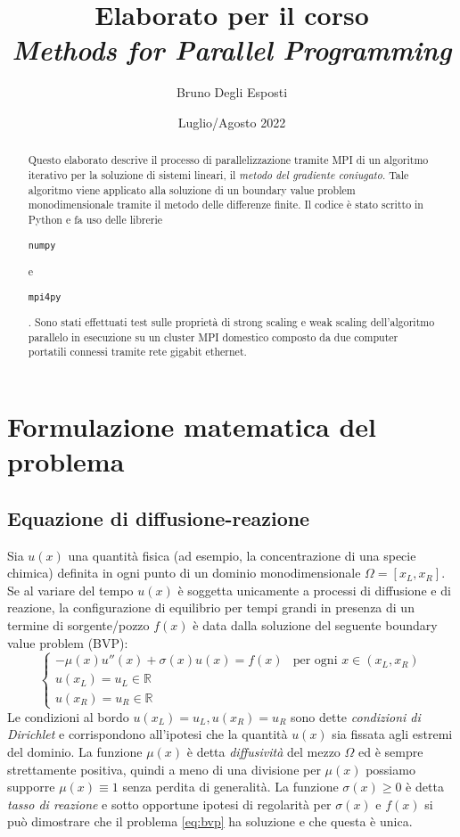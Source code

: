 \documentclass[a4paper,11pt]{article}
\title{\Huge{\bf{
	Elaborato per il corso \\
	\emph{Methods for Parallel Programming}
}}}
\author{\huge{Bruno Degli Esposti}}
\date{\Large{Luglio/Agosto 2022}}
\newcommand{\R}{\mathbb{R}}
\newcommand{\code}[1]{\begin{small}\texttt{#1}\end{small}}
\begin{document}
\maketitle

\begin{abstract}
Questo elaborato descrive il processo di parallelizzazione
tramite MPI di un algoritmo iterativo per la soluzione di
sistemi lineari, il \emph{metodo del gradiente coniugato}.
Tale algoritmo viene applicato alla soluzione di un
boundary value problem monodimensionale tramite il metodo
delle differenze finite. Il codice è stato scritto in Python
e fa uso delle librerie \code{numpy} e \code{mpi4py}.
Sono stati effettuati test sulle proprietà di strong scaling
e weak scaling dell'algoritmo parallelo in esecuzione su
un cluster MPI domestico composto da due computer portatili
connessi tramite rete gigabit ethernet.
\end{abstract}

\section{Formulazione matematica del problema}
\subsection{Equazione di diffusione-reazione}
Sia $u(x)$ una quantità fisica (ad esempio, la concentrazione
di una specie chimica) definita in ogni punto di un dominio
monodimensionale $\Omega = [x_L,x_R]$. Se al variare del tempo
$u(x)$ è soggetta unicamente a processi di diffusione e di
reazione, la configurazione di equilibrio per tempi grandi
in presenza di un termine di sorgente/pozzo $f(x)$ è data
dalla soluzione del seguente boundary value problem (BVP):
\begin{equation} \label{eq:bvp}
\begin{cases}
-\mu(x) u''(x) + \sigma(x) u(x) = f(x)
& \text{per ogni $x \in (x_L,x_R)$} \\
u(x_L) = u_L \in \R \\
u(x_R) = u_R \in \R
\end{cases}
\end{equation}
Le condizioni al bordo $u(x_L) = u_L, u(x_R) = u_R$ sono dette
\emph{condizioni di Dirichlet} e corrispondono all'ipotesi che
la quantità $u(x)$ sia fissata agli estremi del dominio.
La funzione $\mu(x)$ è detta \emph{diffusività} del mezzo $\Omega$
ed è sempre strettamente positiva, quindi a meno di una divisione
per $\mu(x)$ possiamo supporre $\mu(x) \equiv 1$ senza perdita
di generalità.
La funzione $\sigma(x) \geq 0$ è detta \emph{tasso di reazione}
e sotto opportune ipotesi di regolarità per $\sigma(x)$ e $f(x)$
si può dimostrare che il problema \eqref{eq:bvp} ha soluzione
e che questa è unica.
\end{document}

